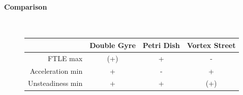 \paragraph{Comparison} $\ $
\begin{figure}[H]
\centering
\begin{tabular}{r|ccc}
 &{Double Gyre}&{Petri Dish}&{Vortex Street}\\ \hline
 {FTLE max} & (+) & + & -\\
 {Acceleration min} & + & - & +\\
 {Unsteadiness min} & + & + & (+)
\end{tabular}

\end{figure}
























